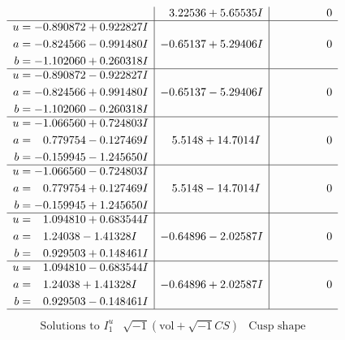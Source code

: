 \documentclass[1p]{elsarticle_modified}
\theoremstyle{definition}
\newcommand{\I}{\sqrt{-1}}
\begin{document}
$$\begin{array}{c|c|c}
 & \phantom{-}3.22536 + 5.65535 I & \phantom{-0.000000 } 0 \\ \hline\begin{aligned}
u &= -0.890872 + 0.922827 I \\
a &= -0.824566 - 0.991480 I \\
b &= -1.102060 + 0.260318 I\end{aligned}
 & -0.65137 + 5.29406 I & \phantom{-0.000000 } 0 \\ \hline\begin{aligned}
u &= -0.890872 - 0.922827 I \\
a &= -0.824566 + 0.991480 I \\
b &= -1.102060 - 0.260318 I\end{aligned}
 & -0.65137 - 5.29406 I & \phantom{-0.000000 } 0 \\ \hline\begin{aligned}
u &= -1.066560 + 0.724803 I \\
a &= \phantom{-}0.779754 - 0.127469 I \\
b &= -0.159945 - 1.245650 I\end{aligned}
 & \phantom{-}5.5148 + 14.7014 I & \phantom{-0.000000 } 0 \\ \hline\begin{aligned}
u &= -1.066560 - 0.724803 I \\
a &= \phantom{-}0.779754 + 0.127469 I \\
b &= -0.159945 + 1.245650 I\end{aligned}
 & \phantom{-}5.5148 - 14.7014 I & \phantom{-0.000000 } 0 \\ \hline\begin{aligned}
u &= \phantom{-}1.094810 + 0.683544 I \\
a &= \phantom{-}1.24038 - 1.41328 I \\
b &= \phantom{-}0.929503 + 0.148461 I\end{aligned}
 & -0.64896 - 2.02587 I & \phantom{-0.000000 } 0 \\ \hline\begin{aligned}
u &= \phantom{-}1.094810 - 0.683544 I \\
a &= \phantom{-}1.24038 + 1.41328 I \\
b &= \phantom{-}0.929503 - 0.148461 I\end{aligned}
 & -0.64896 + 2.02587 I & \phantom{-0.000000 } 0\\
 \hline 
 \end{array}$$\newpage$$\begin{array}{c|c|c}  
\text{Solutions to }I^u_{1}& \I (\text{vol} + \sqrt{-1}CS) & \text{Cusp shape}\\

\end{array}$$
\end{document}
